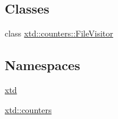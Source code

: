 \subsection*{Classes}
\begin{DoxyCompactItemize}
\item 
class \hyperlink{classxtd_1_1counters_1_1FileVisitor}{xtd\+::counters\+::\+File\+Visitor}
\end{DoxyCompactItemize}
\subsection*{Namespaces}
\begin{DoxyCompactItemize}
\item 
 \hyperlink{namespacextd}{xtd}
\item 
 \hyperlink{namespacextd_1_1counters}{xtd\+::counters}
\end{DoxyCompactItemize}
